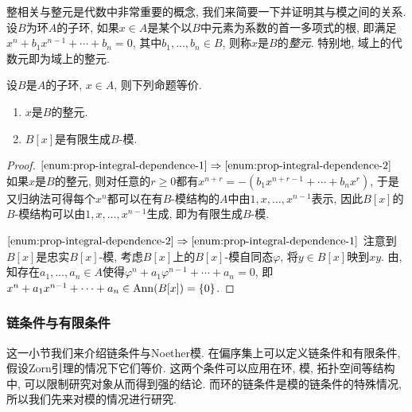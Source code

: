 整相关与整元是代数中非常重要的概念, 我们来简要一下并证明其与模之间的关系. 设$B$为环$A$的子环, 如果$x\in A$是某个以$B$中元素为系数的首一多项式的根, 即满足$x^n+b_1x^{n-1}+\dotsb +b_n=0$, 其中$b_1, \dotsc, b_n\in B$, 则称$x$是$B$的\emph{整元}. 特别地, 域上的代数元即为域上的整元.

\begin{proposition}\label{prop:integraldependence}
  设$B$是$A$的子环, $x\in A$, 则下列命题等价.
  \begin{enumerate}
    \item\label{enum:prop-integral-dependence-1} $x$是$B$的整元.
    \item\label{enum:prop-integral-dependence-2} $B[x]$是有限生成$B$-模.
  \end{enumerate}
\end{proposition}

\begin{proof}
  $\ref{enum:prop-integral-dependence-1}\Rightarrow\ref{enum:prop-integral-dependence-2}$ 如果$x$是$B$的整元, 则对任意的$r\geq 0$都有$x^{n+r}=-(b_1x^{n+r-1}+\dotsb +b_nx^r)$, 于是又归纳法可得每个$x^n$都可以在有$B$-模结构的$A$中由$1, x, \dotsc, x^{n-1}$表示, 因此$B[x]$的$B$-模结构可以由$1, x, \dotsc, x^{n-1}$生成, 即为有限生成$B$-模.

  $\ref{enum:prop-integral-dependence-2}\Rightarrow\ref{enum:prop-integral-dependence-1}$ 注意到$B[x]$是忠实$B[x]$-模, 考虑$B[x]$上的$B[x]$-模自同态$\varphi$, 将$y\in B[x]$映到$xy$. 由, 知存在$a_1, \dotsc, a_n\in A$使得$\varphi^n +a_1\varphi^{n-1}+\dotsb +a_n=0$, 即$x^n +a_1x^{n-1}+\dotsb +a_n\in \operatorname{Ann} (B[x])=\{0\}$.
\end{proof}


\subsubsection{链条件与有限条件}

这一小节我们来介绍链条件与Noether模. 在偏序集上可以定义链条件和有限条件, 假设Zorn引理的情况下它们等价. 这两个条件可以应用在环, 模, 拓扑空间等结构中, 可以限制研究对象从而得到强的结论. 而环的链条件是模的链条件的特殊情况, 所以我们先来对模的情况进行研究.

